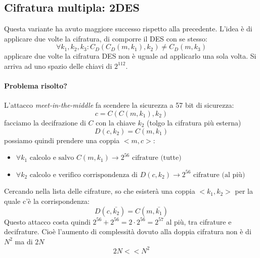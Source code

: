 \subsection{Cifratura multipla: 2DES}
Questa variante ha avuto maggiore successo rispetto alla precedente. L'idea è di applicare due volte la cifratura, di comporre il DES con se stesso:
$$ \forall k_1, k_2, k_3: C_D(C_D(m, k_1), k_2) \neq C_D(m, k_3) $$
applicare due volte la cifratura DES non è uguale ad applicarlo una sola volta.
Si arriva ad uno spazio delle chiavi di $2^{112}$.
\paragraph{Problema risolto?} L'attacco \emph{meet-in-the-middle} fa scendere la sicurezza a 57 bit di sicurezza:
$$ c = C(C(m,k_1), k_2) $$
facciamo la decifrazione di $C$ con la chiave $k_2$ (tolgo la cifratura più esterna)
$$ D(c,k_2) = C(m,k_1) $$
possiamo quindi prendere una coppia $<m, c>$:
\begin{itemize}
	\item $ \forall k_1 \text{ calcolo e salvo } C(m, k_1) \xrightarrow{} 2^{56} \text{ cifrature (tutte)}$
	\item $ \forall k_2 \text{ calcolo e verifico corrispondenza di } D(c, k_2) \xrightarrow{} 2^{56} \text{ cifrature (al più) }$
\end{itemize}
Cercando nella lista delle cifrature, so che esisterà una coppia $<k_1, k_2>$ per la quale c'è la corrispondenza:
$$ D(c, \bar{k_2}) = C(m, \bar{k_1}) $$
Questo attacco costa quindi $2^{56} + 2^{56} = 2 \cdot 2^{56} = 2^{57}$ al più, tra cifrature e decifrature. Cioè l'aumento di complessità dovuto alla doppia cifratura non è di $N^2$ ma di $2N$
$$2N << N^2$$


